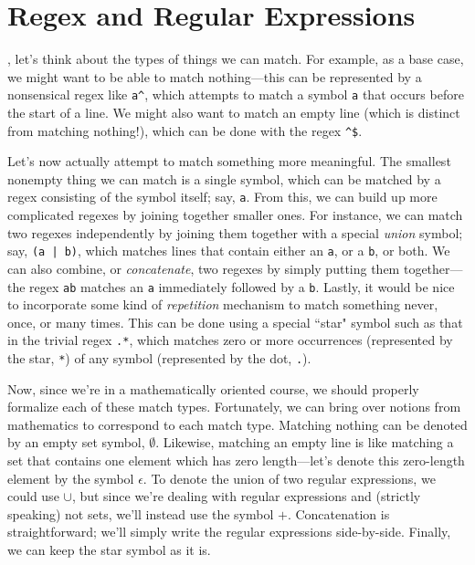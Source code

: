 \section{Regex and Regular Expressions}\label{sec:regexregularexpressions}

, let's think about the types of things we can match. For example, as a base case, we might want to be able to match nothing---this can be represented by a nonsensical regex like \texttt{a\^}, which attempts to match a symbol \texttt{a} that occurs before the start of a line. We might also want to match an empty line (which is distinct from matching nothing!), which can be done with the regex \texttt{\^{}\$}.

Let's now actually attempt to match something more meaningful. The smallest nonempty thing we can match is a single symbol, which can be matched by a regex consisting of the symbol itself; say, \texttt{a}. From this, we can build up more complicated regexes by joining together smaller ones. For instance, we can match two regexes independently by joining them together with a special \emph{union} symbol; say, \texttt{(a | b)}, which matches lines that contain either an \texttt{a}, or a \texttt{b}, or both. We can also combine, or \emph{concatenate}, two regexes by simply putting them together---the regex \texttt{ab} matches an \texttt{a} immediately followed by a \texttt{b}. Lastly, it would be nice to incorporate some kind of \emph{repetition} mechanism to match something never, once, or many times. This can be done using a special ``star" symbol such as that in the trivial regex \texttt{.*}, which matches zero or more occurrences (represented by the star, \texttt{*}) of any symbol (represented by the dot, \texttt{.}).

Now, since we're in a mathematically oriented course, we should properly formalize each of these match types. Fortunately, we can bring over notions from mathematics to correspond to each match type. Matching nothing can be denoted by an empty set symbol, $\emptyset$. Likewise, matching an empty line is like matching a set that contains one element which has zero length---let's denote this zero-length element by the symbol $\epsilon$. To denote the union of two regular expressions, we could use $\cup$, but since we're dealing with regular expressions and (strictly speaking) not sets, we'll instead use the symbol $+$. Concatenation is straightforward; we'll simply write the regular expressions side-by-side. Finally, we can keep the star symbol as it is.

